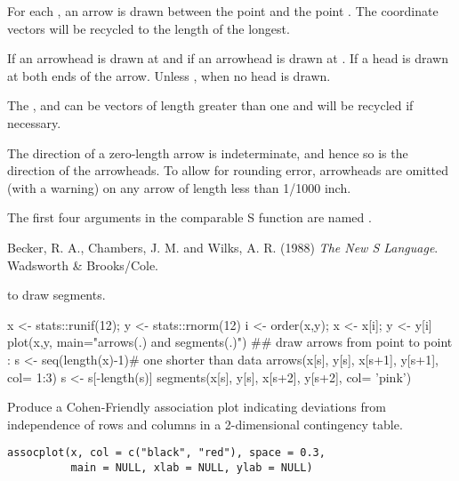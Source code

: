 %
\begin{Details}\relax
For each , an arrow is drawn between the point  and the point .  The coordinate vectors
will be recycled to the length of the longest.

If  an arrowhead is drawn at  and if
 an arrowhead is drawn at .  If
 a head is drawn at both ends of the arrow.  Unless
, when no head is drawn.

The  ,  and 
can be vectors of length greater than one and will be recycled if
necessary.


The direction of a zero-length arrow is indeterminate, and hence so is
the direction of the arrowheads.  To allow for rounding error,
arrowheads are omitted (with a warning) on any arrow of length less
than 1/1000 inch.
\end{Details}
%
\begin{Note}\relax
The first four arguments in the comparable S function are named
.
\end{Note}
%
\begin{References}\relax
Becker, R. A., Chambers, J. M. and Wilks, A. R. (1988)
\emph{The New S Language}.
Wadsworth \& Brooks/Cole.
\end{References}
%
\begin{SeeAlso}\relax
{} to draw segments.
\end{SeeAlso}
%
\begin{Examples}
\begin{ExampleCode}
x <- stats::runif(12); y <- stats::rnorm(12)
i <- order(x,y); x <- x[i]; y <- y[i]
plot(x,y, main="arrows(.) and segments(.)")
## draw arrows from point to point :
s <- seq(length(x)-1)# one shorter than data
arrows(x[s], y[s], x[s+1], y[s+1], col= 1:3)
s <- s[-length(s)]
segments(x[s], y[s], x[s+2], y[s+2], col= 'pink')
\end{ExampleCode}
\end{Examples}
%
\begin{Description}\relax
Produce a Cohen-Friendly association plot indicating deviations from
independence of rows and columns in a 2-dimensional contingency
table.
\end{Description}
%
\begin{Usage}
\begin{verbatim}
assocplot(x, col = c("black", "red"), space = 0.3,
          main = NULL, xlab = NULL, ylab = NULL)
\end{verbatim}
\end{Usage}
